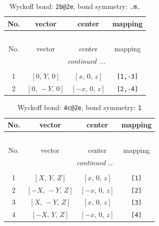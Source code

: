 \documentclass[fleqn,8pt]{jsarticle}
\begin{document}
\renewcommand{\arraystretch}{1.2}
\begin{longtable}{cccc}
\caption{Wyckoff bond: {\tt 2b@2e}, bond symmetry: {\tt .m.}}
 \\
 \hline \hline
No. & vector & center & mapping \\ \hline \endfirsthead

\multicolumn{3}{l}{\tablename\ \thetable{}} \\
 \hline \hline
No. & vector & center & mapping \\ \hline \endhead

 \hline \hline
\multicolumn{3}{r}{\footnotesize\it continued ...} \\ \endfoot

 \hline \hline
\multicolumn{3}{r}{} \\ \endlastfoot

1 & $\left[ 0,\, Y,\, 0 \right]$ & $\left[ x,\, 0,\, z \right]$ & {\tt [1,-3]} \\ \hline
2 & $\left[ 0,\, - Y,\, 0 \right]$ & $\left[ - x,\, 0,\, z \right]$ & {\tt [2,-4]} \\
\end{longtable}
\renewcommand{\arraystretch}{1.2}
\begin{longtable}{cccc}
\caption{Wyckoff bond: {\tt 4c@2e}, bond symmetry: {\tt 1}}
 \\
 \hline \hline
No. & vector & center & mapping \\ \hline \endfirsthead

\multicolumn{3}{l}{\tablename\ \thetable{}} \\
 \hline \hline
No. & vector & center & mapping \\ \hline \endhead

 \hline \hline
\multicolumn{3}{r}{\footnotesize\it continued ...} \\ \endfoot

 \hline \hline
\multicolumn{3}{r}{} \\ \endlastfoot

1 & $\left[ X,\, Y,\, Z \right]$ & $\left[ x,\, 0,\, z \right]$ & {\tt [1]} \\ \hline
2 & $\left[ - X,\, - Y,\, Z \right]$ & $\left[ - x,\, 0,\, z \right]$ & {\tt [2]} \\ \hline
3 & $\left[ X,\, - Y,\, Z \right]$ & $\left[ x,\, 0,\, z \right]$ & {\tt [3]} \\ \hline
4 & $\left[ - X,\, Y,\, Z \right]$ & $\left[ - x,\, 0,\, z \right]$ & {\tt [4]} \\
\end{longtable}
\end{document}
